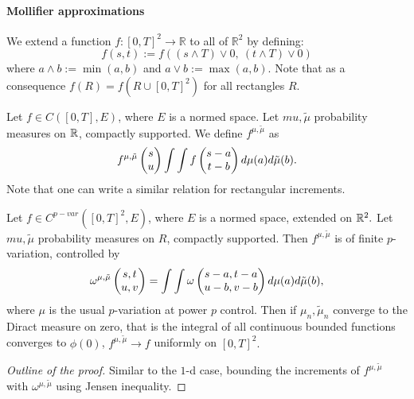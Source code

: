 \paragraph{Mollifier approximations}

\begin{definition}
We extend a function \( f : [0,T]^2 \to \mathbb{R} \) to all of \( \mathbb{R}^2 \) by defining:
\begin{equation}
    f(s,t) := f\left( (s \land T) \lor 0,\ (t \land T) \lor 0 \right)
\end{equation}
where \( a \land b := \min(a,b) \) and \( a \lor b := \max(a,b) \).
Note that as a consequence $f(R) = f(R \cup [0,T]^2)$ for all rectangles $R$.
\end{definition}

\begin{definition}
    Let \( f \in C([0,T],E) \), where \( E \) is a normed space.
    Let \( mu, \tilde{\mu} \) probability measures on \( \mathbb{R} \), compactly supported.
    We define \( f^{\mu,\tilde{\mu}} \) as 
    \begin{equation}
        f^{\mu, \tilde{\mu}} \begin{pmatrix} s \\ u \end{pmatrix} \int \int f \begin{pmatrix} s - a \\ t - b \end{pmatrix} d\mu(a) d\tilde{\mu}(b).
    \end{equation}
    Note that one can write a similar relation for rectangular increments.
\end{definition}

\begin{proposition}
    Let \( f \in C^{p-var}([0,T]^2,E) \), where \( E \) is a normed space, extended on $\mathbb{R}^2.$
    Let \( mu, \tilde{\mu} \) probability measures on \( R \), compactly supported. 
    Then \( f^{\mu, \tilde{\mu}} \) is of finite $p$-variation, controlled by
    \begin{equation}
        \omega^{\mu, \tilde{\mu}} \begin{pmatrix} s,t \\ u,v \end{pmatrix} = \int \int \omega \begin{pmatrix} s-a,t-a \\ u-b,v-b \end{pmatrix} d\mu(a) d\tilde{\mu}(b),
    \end{equation}
    where $\mu$ is the usual $p$-variation at power $p$ control.
    Then if $\mu_n, \tilde{\mu}_n$ converge to the Diract measure on zero, that is the integral of all continuous bounded functions converges to \( \phi(0) \), \( f^{\mu,\tilde{\mu}} \rightarrow f \) uniformly on \([0,T]^2.\)
\end{proposition}
\begin{proof}[Outline of the proof]
    Similar to the \( 1 \)-d case, bounding the increments of \( f^{\mu,\tilde{\mu}} \) with \( \omega^{\mu,\tilde{\mu}} \) using Jensen inequality.
\end{proof}
